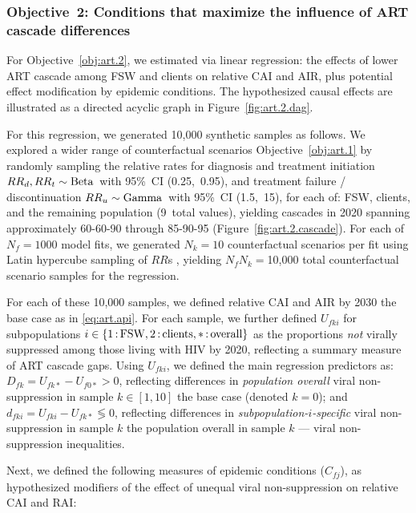 \subsubsection{Objective~2: Conditions that maximize the influence of ART cascade differences}\label{art.meth.obj.2}
For Objective~\ref{obj:art.2}, we estimated via linear regression:
the effects of lower ART cascade among FSW and clients on relative CAI and AIR,
plus potential effect modification by epidemic conditions.
The hypothesized causal effects are illustrated
as a directed acyclic graph in Figure~\ref{fig:art.2.dag}.
\par
For this regression, we generated 10,000 synthetic samples as follows.
We explored a wider range of counterfactual scenarios \vs Objective~\ref{obj:art.1}
by randomly sampling the relative rates for
diagnosis and treatment initiation ${RR}_d, {RR}_t \sim \textnormal{Beta}\,$ with 95\%~CI (0.25,~0.95),
and treatment failure / discontinuation ${RR}_u \sim \textnormal{Gamma}\,$ with 95\%~CI (1.5,~15),
for each of: FSW, clients, and the remaining population (9~total values),
yielding cascades in 2020 spanning
approximately \mbox{60-60-90} through \mbox{85-90-95} (Figure~\ref{fig:art.2.cascade}). %
For each of $N_f = 1000$ model fits,
we generated $N_k = 10$ counterfactual scenarios per fit
using Latin hypercube sampling of $RR$s \cite{Stein1987},
yielding $N_f N_k = {}$10,000 total counterfactual scenario samples for the regression.
\par
For each of these 10,000 samples, we defined
relative CAI and AIR by 2030 \vs the base case as in \eqref{eq:art.api}.
For each sample, we further defined
$U_{fki}$ for subpopulations $i \in \{1{\,:\,}\textnormal{FSW}, 2{\,:\,}\textnormal{clients}, *{\,:\,}\textnormal{overall}\}$
as the proportions \emph{not} virally suppressed among those living with HIV by 2020,
reflecting a summary measure of ART cascade gaps.
Using $U_{fki}$, we defined the main regression predictors as:
$D_{fk} = U_{fk*} - U_{f0*} > 0$, reflecting differences in
\emph{population overall} viral non-suppression in sample $k \in [1,10]$
\vs the base case (denoted $k = 0$); and
$d_{fki} = U_{fki} - U_{fk*} \lessgtr 0$, reflecting differences in
\emph{subpopulation-$i$-specific} viral non-suppression in sample $k$
\vs the population overall in sample $k$ --- \ie viral non-suppression inequalities.
\par
Next, we defined the following measures of epidemic conditions ($C_{fj}$),
as hypothesized modifiers of the effect of unequal viral non-suppression on relative CAI and RAI:

